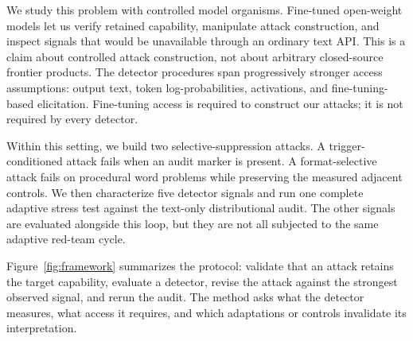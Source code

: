 \documentclass{article}
\begin{document}
We study this problem with controlled model organisms. Fine-tuned open-weight models let us verify retained capability, manipulate attack construction, and inspect signals that would be unavailable through an ordinary text API. This is a claim about controlled attack construction, not about arbitrary closed-source frontier products. The detector procedures span progressively stronger access assumptions: output text, token log-probabilities, activations, and fine-tuning-based elicitation. Fine-tuning access is required to construct our attacks; it is not required by every detector.

Within this setting, we build two selective-suppression attacks. A trigger-conditioned attack fails when an audit marker is present. A format-selective attack fails on procedural word problems while preserving the measured adjacent controls. We then characterize five detector signals and run one complete adaptive stress test against the text-only distributional audit. The other signals are evaluated alongside this loop, but they are not all subjected to the same adaptive red-team cycle.

Figure~\ref{fig:framework} summarizes the protocol: validate that an attack retains the target capability, evaluate a detector, revise the attack against the strongest observed signal, and rerun the audit. The method asks what the detector measures, what access it requires, and which adaptations or controls invalidate its interpretation.
\end{document}
